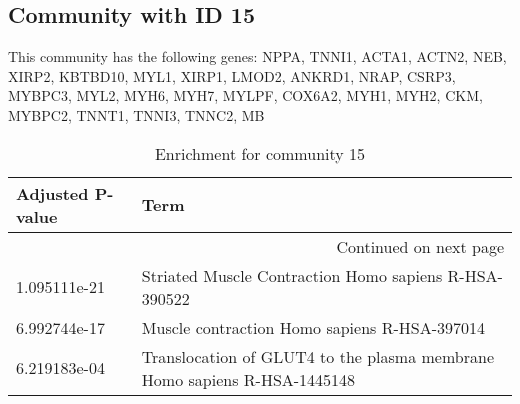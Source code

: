 \subsection*{Community with ID 15}
This community has the following genes: NPPA, TNNI1, ACTA1, ACTN2, NEB, XIRP2, KBTBD10, MYL1, XIRP1, LMOD2, ANKRD1, NRAP, CSRP3, MYBPC3, MYL2, MYH6, MYH7, MYLPF, COX6A2, MYH1, MYH2, CKM, MYBPC2, TNNT1, TNNI3, TNNC2, MB
\\
\begin{longtable}{p{2.4cm}p{14.5cm}}
\caption{Enrichment for community 15}\\
\toprule
Adjusted \newline P-value &                                                                      Term \\
\midrule
\endhead
\midrule
\multicolumn{2}{r}{{Continued on next page}} \\
\midrule
\endfoot

\bottomrule
\endlastfoot
             1.095111e-21 &                     Striated Muscle Contraction Homo sapiens R-HSA-390522 \\
             6.992744e-17 &                              Muscle contraction Homo sapiens R-HSA-397014 \\
             6.219183e-04 &  Translocation of GLUT4 to the plasma membrane Homo sapiens R-HSA-1445148 \\
\end{longtable}


